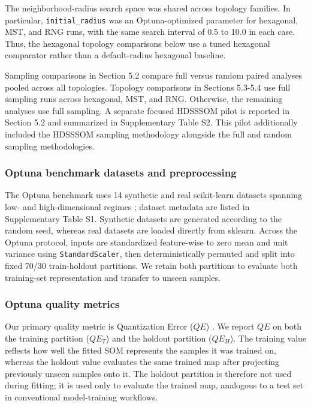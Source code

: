 \documentclass[10pt]{article} %
\begin{document}
The neighborhood-radius search space was shared across topology families. In particular, \texttt{initial\_radius} was an Optuna-optimized parameter for hexagonal, MST, and RNG runs, with the same search interval of 0.5 to 10.0 in each case. Thus, the hexagonal topology comparisons below use a tuned hexagonal comparator rather than a default-radius hexagonal baseline.

Sampling comparisons in Section 5.2 compare full versus random paired analyses pooled across all topologies. Topology comparisons in Sections 5.3-5.4 use full sampling runs across hexagonal, MST, and RNG. Otherwise, the remaining analyses use full sampling. A separate focused HDSSSOM pilot is reported in Section 5.2 and summarized in Supplementary Table S2. This pilot additionally included the HDSSSOM sampling methodology alongside the full and random sampling methodologies.

\subsubsection{Optuna benchmark datasets and preprocessing}

The Optuna benchmark uses 14 synthetic and real scikit-learn datasets spanning low- and high-dimensional regimes \citep{pedregosaScikitlearnMachineLearning2011}; dataset metadata are listed in Supplementary Table S1. Synthetic datasets are generated according to the random seed, whereas real datasets are loaded directly from sklearn. Across the Optuna protocol, inputs are standardized feature-wise to zero mean and unit variance using \texttt{StandardScaler}, then deterministically permuted and split into fixed 70/30 train-holdout partitions. We retain both partitions to evaluate both training-set representation and transfer to unseen samples.

\subsubsection{Optuna quality metrics}

Our primary quality metric is Quantization Error ($QE$) \citep{kohonenSelfOrganizingMaps2001}. We report $QE$ on both the training partition ($QE_T$) and the holdout partition ($QE_H$). The training value reflects how well the fitted SOM represents the samples it was trained on, whereas the holdout value evaluates the same trained map after projecting previously unseen samples onto it. The holdout partition is therefore not used during fitting; it is used only to evaluate the trained map, analogous to a test set in conventional model-training workflows.
\end{document}
